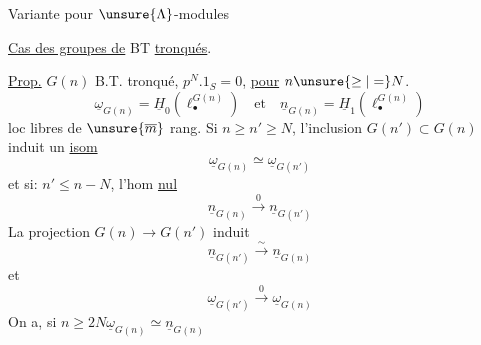 Variante pour $\unsure{\Lambda}$-modules

\uline{Cas des groupes de} BT \uline{tronqués}.

\uline{Prop.} $G(n)$ B.T. tronqué, $p^N.1_S=0$, \uline{pour} $n\unsure{\geq|=}N$.
\[
\underline\omega_{G(n)}=\underline H_0(\ell_\bullet^{G(n)})\quad\text{et}\quad\underline n_{G(n)}=\underline H_1(\ell_\bullet^{G(n)})
\]
loc libres de $\unsure{\overline m}$ rang. Si $n\geq n'\geq N$, l'inclusion $G(n')\subset G(n)$ \deleted{$\unsure{\simeq}$} induit un \uline{isom}
\[
\underline\omega_{G(n)}\simeq\underline\omega_{G(n')}
\]
et si: $n'\leq n-N$, l'hom \uline{nul}
\[
\underline n_{G(n)}\xrightarrow{0}\underline n_{G(n')}
\]
La projection $G(n)\longrightarrow G(n')$ induit
\[
\underline n_{G(n')}\xrightarrow{\sim}\underline n_{G(n)}
\]
et
\[
\underline\omega_{G(n')}\xrightarrow{0}\underline\omega_{G(n)}
\]
On a, si $n\geq2N$\qquad$\underline\omega_{G(n)}\simeq\underline n_{G(n)}$
